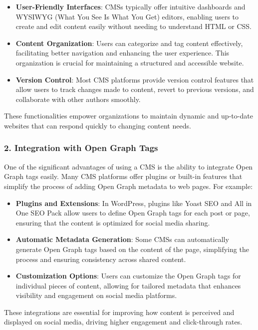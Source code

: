 \begin{itemize}
    \item \textbf{User-Friendly Interfaces}: CMSs typically offer intuitive dashboards and WYSIWYG (What You See Is What You Get) editors, enabling users to create and edit content easily without needing to understand HTML or CSS.
    \item \textbf{Content Organization}: Users can categorize and tag content effectively, facilitating better navigation and enhancing the user experience. This organization is crucial for maintaining a structured and accessible website.
    \item \textbf{Version Control}: Most CMS platforms provide version control features that allow users to track changes made to content, revert to previous versions, and collaborate with other authors smoothly.
\end{itemize}

These functionalities empower organizations to maintain dynamic and up-to-date websites that can respond quickly to changing content needs.

\subsubsection{2. Integration with Open Graph Tags}

One of the significant advantages of using a CMS is the ability to integrate Open Graph tags easily. Many CMS platforms offer plugins or built-in features that simplify the process of adding Open Graph metadata to web pages. For example:

\begin{itemize}
    \item \textbf{Plugins and Extensions}: In WordPress, plugins like Yoast SEO and All in One SEO Pack allow users to define Open Graph tags for each post or page, ensuring that the content is optimized for social media sharing.
    \item \textbf{Automatic Metadata Generation}: Some CMSs can automatically generate Open Graph tags based on the content of the page, simplifying the process and ensuring consistency across shared content.
    \item \textbf{Customization Options}: Users can customize the Open Graph tags for individual pieces of content, allowing for tailored metadata that enhances visibility and engagement on social media platforms.
\end{itemize}

These integrations are essential for improving how content is perceived and displayed on social media, driving higher engagement and click-through rates.

